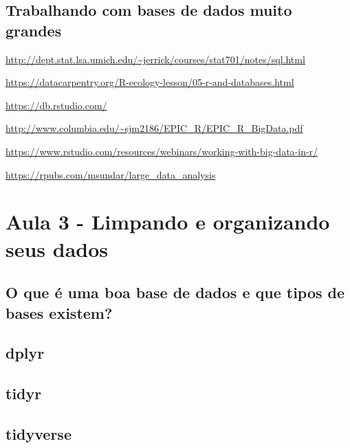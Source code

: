\documentclass[12pt,a4paper,oneside]{erdc}
\begin{document}
\section{Trabalhando com bases de dados muito grandes}

\url{http://dept.stat.lsa.umich.edu/~jerrick/courses/stat701/notes/sql.html}

\url{https://datacarpentry.org/R-ecology-lesson/05-r-and-databases.html}

\url{https://db.rstudio.com/}

\url{http://www.columbia.edu/~sjm2186/EPIC_R/EPIC_R_BigData.pdf}

\url{https://www.rstudio.com/resources/webinars/working-with-big-data-in-r/}

\url{https://rpubs.com/msundar/large_data_analysis}







%
%


%
%
%


\chapter{Aula 3 - Limpando e organizando seus dados}

	\section{O que é uma boa base de dados e que tipos de bases existem?}
	
	\section{dplyr}
	
	\section{tidyr}
	
	\section{tidyverse}

%
%
\end{document}
